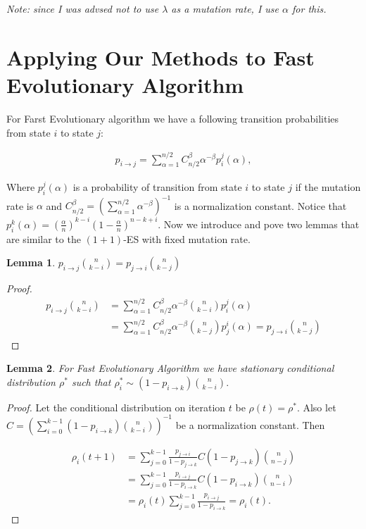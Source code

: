 \documentclass{article}
\newtheorem{lemma}{Lemma}
\begin{document}
\textit{Note: since I was advsed not to use $\lambda$ as a mutation rate, I use $\alpha$ for this.}

 \section{Applying Our Methods to Fast Evolutionary Algorithm}

For Farst Evolutionary algorithm we have a following transition probabilities from state $i$ to state $j:$

\begin{align*}
  p_{i \to j} = \sum\limits_{\alpha = 1}^{n / 2} C_{n / 2}^\beta \alpha^{-\beta} p_i^j(\alpha),
\end{align*}

Where $p_i^j(\alpha)$ is a probability of transition from state $i$ to state $j$ if the mutation rate is $\alpha$ and $C_{n / 2}^{\beta} = \left(\sum\limits_{\alpha = 1}^{n / 2} \alpha^{-\beta}\right)^{-1}$ is a normalization constant. Notice that $p_i^k(\alpha) = \left(\frac{\alpha}{n}\right)^{k - i} \left(1 - \frac{\alpha}{n}\right)^{n - k + i}.$
Now we introduce and pove two lemmas that are similar to the $(1+1)$-ES with fixed mutation rate.

\begin{lemma}
  $p_{i \to j} \binom{n}{k - i} = p_{j \to i} \binom{n}{k - j}$
\end{lemma}

\begin{proof}
\begin{align*}
  p_{i \to j} \binom{n}{k - i} &= \sum\limits_{\alpha = 1}^{n / 2} C_{n / 2}^\beta \alpha^{-\beta} \binom{n}{k - i} p_i^j(\alpha) \\
  &= \sum\limits_{\alpha = 1}^{n / 2} C_{n / 2}^\beta \alpha^{-\beta} \binom{n}{k - j} p_j^i(\alpha) = p_{j \to i} \binom{n}{k - j}
\end{align*}
\end{proof}

 \begin{lemma}
   For Fast Evolutionary Algorithm we have stationary conditional distribution $\rho^*$ such that $\rho_i^* \sim (1 - p_{i \to k}) \binom{n}{k - i}.$
 \end{lemma}
\begin{proof}
  Let the conditional distribution on iteration $t$ be $\rho(t) = \rho^*.$ Also let $C = \left(\sum\limits_{i = 0}^{k - 1} (1 - p_{i \to k}) \binom{n}{k - i}\right)^{-1}$ be a normalization constant. Then

  \begin{align*}
    \rho_i(t + 1) &= \sum\limits_{j = 0}^{k - 1} \frac{p_{j \to i}}{1 - p_{j \to k}} C(1 - p_{j \to k}) \binom{n}{n - j} \\
                  &= \sum\limits_{j = 0}^{k - 1} \frac{p_{i \to j}}{1 - p_{i \to k}} C(1 - p_{i \to k}) \binom{n}{n - i} \\
                  &= \rho_i(t) \sum\limits_{j = 0}^{k - 1} \frac{p_{i \to j}}{1 - p_{i \to k}} = \rho_i(t).
  \end{align*}
\end{proof}
\end{document}
